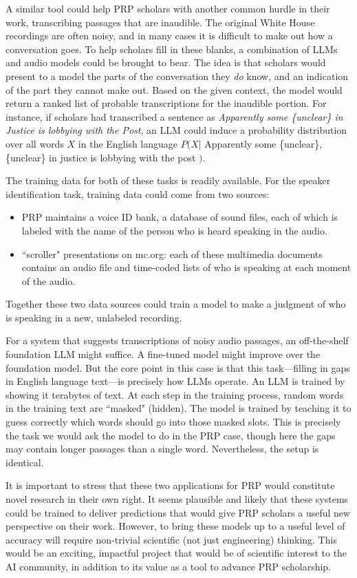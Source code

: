 \documentclass[12pt, oneside]{article}   	%
\begin{document}
A similar tool could help PRP scholars with another common hurdle in their work, transcribing passages that are inaudible.  The original White House recordings are often noisy, and in many cases it is difficult  to make out how a conversation goes.  To help scholars fill in these blanks, a combination of LLMs and audio models could be brought to bear.  The idea is that scholars would present to a model the parts of the conversation they \emph{do} know, and an indication of the part they cannot make out.  Based on the given context, the model would return a ranked list of probable transcriptions for the inaudible portion.  For instance, if scholars had transcribed a sentence as \emph{Apparently some \{unclear\} in Justice is lobbying with the Post}, an LLM could induce a probability distribution over all words $X$ in the English language $P(X | $ Apparently some \{unclear\}, \{unclear\} in justice is lobbying with the post $)$.

The training data for both of these tasks is readily available.  For the speaker identification task, training data could come from two sources:
\begin{itemize}
\item PRP maintains a voice ID bank, a database of sound files, each of which is labeled with the name of the person who is heard speaking in the audio.
\item ``scroller" presentations on mc.org: each of these multimedia documents contains an audio file and time-coded lists of who is speaking at each moment of the audio.
\end{itemize}
Together these two data sources could train a model to make a judgment of who is speaking in a new, unlabeled recording.

For a system that suggests transcriptions of noisy audio passages, an off-the-shelf foundation LLM might suffice.  A fine-tuned model might improve over the foundation model.  But the core point in this case is that this task---filling in gaps in English language text---is precisely how LLMs operate.  An LLM is trained by showing it terabytes of text.  At each step in the training process, random words in the training text are ``masked" (hidden).  The model is trained by teaching it to guess correctly which words should go into those masked slots.  This is precisely the task we would ask the model to do in the PRP case, though here the gaps may contain longer passages than a single word.  Nevertheless, the setup is identical.

It is important to stress that these two applications for PRP would constitute novel research in their own right.  It seems plausible and likely that these systems could be trained to deliver predictions that would give PRP scholars a useful new perspective on their work.  However, to bring these models up to a useful level of accuracy will require non-trivial scientific (not just engineering) thinking.  This would be an exciting, impactful project that would be of scientific interest to the AI community, in addition to its value as a tool to advance PRP scholarship.
\end{document}
